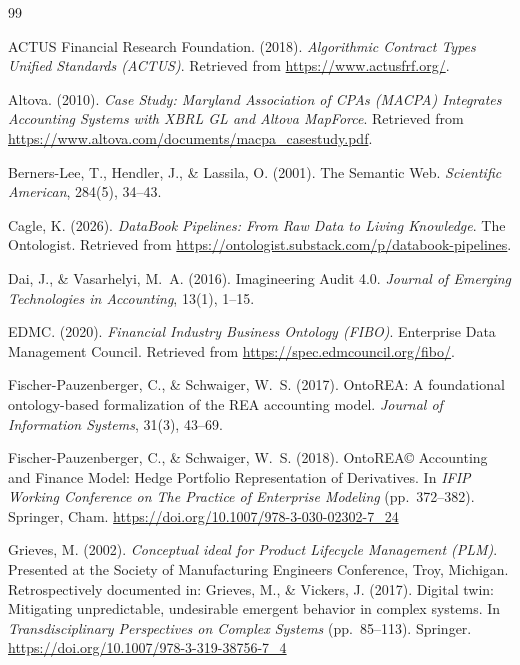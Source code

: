 \documentclass[12pt, a4paper]{article}
\begin{document}
\vspace{1em}

\begin{thebibliography}{99}

ACTUS Financial Research Foundation. (2018). \textit{Algorithmic Contract Types Unified Standards (ACTUS)}. Retrieved from \url{https://www.actusfrf.org/}.

Altova. (2010). \textit{Case Study: Maryland Association of CPAs (MACPA) Integrates Accounting Systems with XBRL GL and Altova MapForce}. Retrieved from \url{https://www.altova.com/documents/macpa_casestudy.pdf}.

Berners-Lee, T., Hendler, J., \& Lassila, O. (2001). The Semantic Web. \textit{Scientific American}, 284(5), 34--43.

Cagle, K. (2026). \textit{DataBook Pipelines: From Raw Data to Living Knowledge}. The Ontologist. Retrieved from \url{https://ontologist.substack.com/p/databook-pipelines}.

Dai, J., \& Vasarhelyi, M.~A. (2016). Imagineering Audit 4.0. \textit{Journal of Emerging Technologies in Accounting}, 13(1), 1--15.

EDMC. (2020). \textit{Financial Industry Business Ontology (FIBO)}. Enterprise Data Management Council. Retrieved from \url{https://spec.edmcouncil.org/fibo/}.

Fischer-Pauzenberger, C., \& Schwaiger, W.~S. (2017). OntoREA: A foundational ontology-based formalization of the REA accounting model. \textit{Journal of Information Systems}, 31(3), 43--69.

Fischer-Pauzenberger, C., \& Schwaiger, W.~S. (2018). OntoREA\copyright{} Accounting and Finance Model: Hedge Portfolio Representation of Derivatives. In \textit{IFIP Working Conference on The Practice of Enterprise Modeling} (pp.~372--382). Springer, Cham. \url{https://doi.org/10.1007/978-3-030-02302-7_24}

Grieves, M. (2002). \textit{Conceptual ideal for Product Lifecycle Management (PLM)}. Presented at the Society of Manufacturing Engineers Conference, Troy, Michigan. Retrospectively documented in: Grieves, M., \& Vickers, J. (2017). Digital twin: Mitigating unpredictable, undesirable emergent behavior in complex systems. In \textit{Transdisciplinary Perspectives on Complex Systems} (pp.~85--113). Springer. \url{https://doi.org/10.1007/978-3-319-38756-7_4}


\end{thebibliography}
\end{document}
